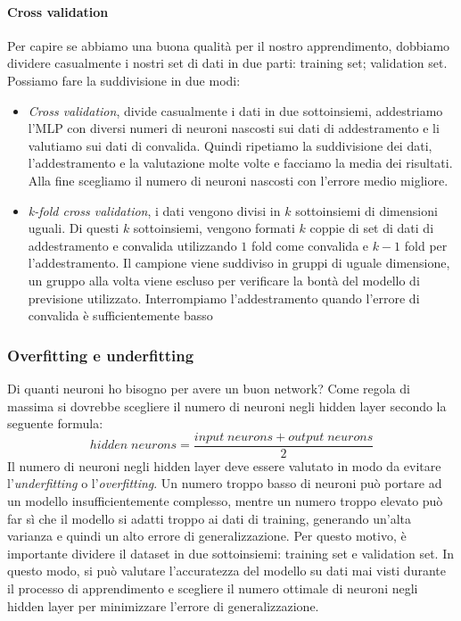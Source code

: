 \paragraph{Cross validation}
Per capire se abbiamo una buona qualità per il nostro apprendimento, dobbiamo dividere casualmente i nostri set di dati in due parti: training set; validation set. Possiamo fare la suddivisione in due modi:
\begin{itemize}
    \item \textit{Cross validation}, divide casualmente i dati in due sottoinsiemi, addestriamo l'MLP con diversi numeri di neuroni nascosti sui dati di addestramento e li valutiamo sui dati di convalida. Quindi ripetiamo la suddivisione dei dati, l'addestramento e la valutazione molte volte e facciamo la media dei risultati. Alla fine scegliamo il numero di neuroni nascosti con l'errore medio migliore.
    \item \textit{k-fold cross validation}, i dati vengono divisi in $k$ sottoinsiemi di dimensioni uguali. Di questi $k$ sottoinsiemi, vengono formati $k$ coppie di set di dati di addestramento e convalida utilizzando $1$ fold come convalida e $k - 1$ fold per l'addestramento. Il campione viene suddiviso in gruppi di uguale dimensione, un gruppo alla volta viene escluso per verificare la bontà del modello di previsione utilizzato. Interrompiamo l'addestramento quando l'errore di convalida è sufficientemente basso
\end{itemize}

\subsubsection{Overfitting e underfitting}
Di quanti neuroni ho bisogno per avere un buon network? Come regola di massima si dovrebbe scegliere il numero di neuroni negli hidden layer secondo la seguente formula:
$$\mathit{hidden\;neurons} = \frac{input\;neurons + output\;neurons}{2}$$
Il numero di neuroni negli hidden layer deve essere valutato in modo da evitare l'\textit{underfitting} o l'\textit{overfitting}. Un numero troppo basso di neuroni può portare ad un modello insufficientemente complesso, mentre un numero troppo elevato può far sì che il modello si adatti troppo ai dati di training, generando un'alta varianza e quindi un alto errore di generalizzazione. Per questo motivo, è importante dividere il dataset in due sottoinsiemi: training set e validation set. In questo modo, si può valutare l'accuratezza del modello su dati mai visti durante il processo di apprendimento e scegliere il numero ottimale di neuroni negli hidden layer per minimizzare l'errore di generalizzazione.

